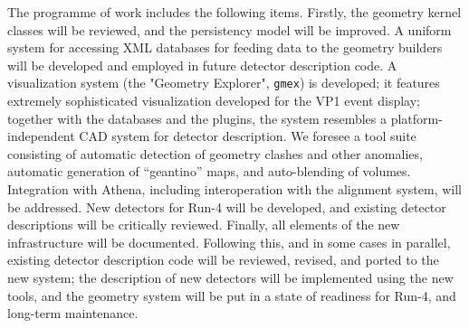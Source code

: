 The programme of work includes the following items.  Firstly, the geometry kernel classes will be  reviewed, and the persistency model will be improved.  A uniform system for accessing XML databases for feeding data to the geometry builders will be developed and employed in future detector description code.  A visualization system (the "Geometry Explorer", \texttt{gmex}) is developed; it features extremely sophisticated visualization developed for the VP1 event display; together with the databases and the plugins, the system resembles a platform-independent CAD system for detector description. We foresee a tool suite consisting of automatic detection of geometry clashes and other anomalies, automatic generation of ``geantino'' maps, and auto-blending of volumes. Integration with Athena, including  interoperation with the alignment system, will be addressed. New detectors for Run-4 will be developed, and existing detector descriptions will be critically reviewed. Finally, all elements of the new infrastructure will be documented. 
Following this, and in some cases in parallel, existing detector description code will be reviewed, revised, and ported to the new system; the description of new detectors will be implemented using the new tools, and the geometry system will be put in a state of readiness for Run-4, and long-term maintenance. 

